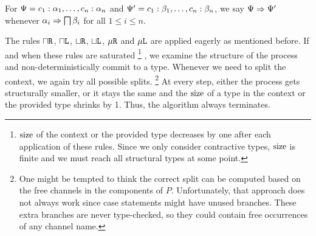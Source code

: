\begin{definition}
  For $\Psi = c_1 : \alpha_1, \ldots, c_n : \alpha_n$ and $\Psi' = c_1 : \beta_1, \ldots, c_n : \beta_n$, we say $\Psi \mathrel\Rightarrow \Psi'$ whenever $\alpha_i \mathrel\Rightarrow \operatorname{\bigsqcap} \beta_i$ for all $1 \le i \le n$.
\end{definition}


The rules $\mathbin{\sqcap}\texttt{R}$, $\mathbin{\sqcap}\texttt{L}$, $\mathbin{\sqcup}\texttt{R}$, $\mathbin{\sqcup}\texttt{L}$, $\mu\texttt{R}$ and $\mu\texttt{L}$ are applied eagerly as mentioned before. If and when these rules are saturated%
\footnote{$\operatorname{size}$ of the context or the provided type decreases by one after each application of these rules. Since we only consider contractive types, $\operatorname{size}$ is finite and we must reach all structural types at some point.}%
, we examine the structure of the process and non-deterministically commit to a type. Whenever we need to split the context, we again try all possible splits.%
\footnote{One might be tempted to think the correct split can be computed based on the free channels in the components of $P$. Unfortunately, that approach does not always work since case statements might have unused branches. These extra branches are never type-checked, so they could contain free occurrences of any channel name.}
At every step, either the process gets structurally smaller, or it stays the same and the $\operatorname{size}$ of a type in the context or the provided type shrinks by 1. Thus, the algorithm always terminates.


